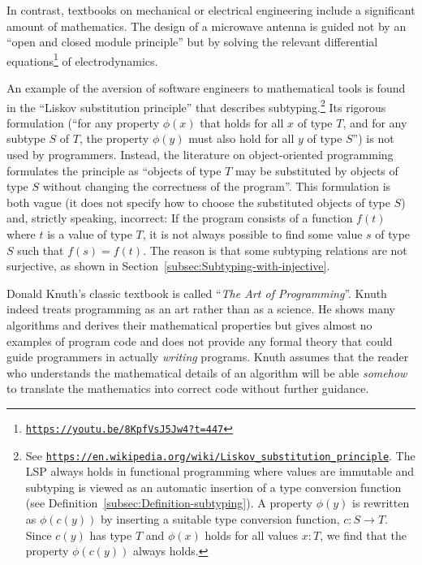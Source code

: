 In contrast, textbooks on mechanical or electrical engineering include
a significant amount of mathematics. The design of a microwave antenna
is guided not by an \textsf{``}open and closed module principle\textsf{''} but by
solving the relevant differential equations\footnote{\texttt{\href{https://youtu.be/8KpfVsJ5Jw4?t=447}{https://youtu.be/8KpfVsJ5Jw4?t=447}}}
of electrodynamics.

An example of the aversion of software engineers to mathematical tools
is found in the \textsf{``}Liskov substitution principle\textsf{''}
that describes subtyping.\footnote{See \texttt{\href{https://en.wikipedia.org/wiki/Liskov_substitution_principle}{https://en.wikipedia.org/wiki/Liskov\_substitution\_principle}}.
The LSP always holds in functional programming where values are immutable
and subtyping is viewed as an automatic insertion of a type conversion
function (see Definition~\ref{subsec:Definition-subtyping}). A property
$\phi(y)$ is rewritten as $\phi(c(y))$ by inserting a suitable type
conversion function, $c:S\rightarrow T$. Since $c(y)$ has type $T$
and $\phi(x)$ holds for all values $x:T$, we find that the property
$\phi(c(y))$ always holds.} Its rigorous formulation (\textsf{``}for any property $\phi(x)$ that holds
for all $x$ of type $T$, and for any subtype $S$ of $T$, the property
$\phi(y)$ must also hold for all $y$ of type $S$\textsf{''}) is not used
by programmers. Instead, the literature on object-oriented programming
formulates the principle as \textsf{``}objects of type $T$ may be substituted
by objects of type $S$ without changing the correctness of the program\textsf{''}.
This formulation  is both vague
(it does not specify how to choose the substituted objects of type
$S$) and, strictly speaking, incorrect: If the program consists of
a function $f(t)$ where $t$ is a value of type $T$, it is not always
possible to find some value $s$ of type $S$ such that $f(s)=f(t)$.
The reason is that some subtyping relations are not surjective, as
shown in Section~\ref{subsec:Subtyping-with-injective}.

Donald Knuth\textsf{'}s classic textbook is called \textsf{``}\emph{The Art of Programming}\textsf{''}.
Knuth indeed treats programming as an art rather than as a science.
He shows many algorithms and derives their mathematical properties
but gives almost no examples of program code and does not provide
any formal theory that could guide programmers in actually \emph{writing}
programs. Knuth assumes that the reader who understands the mathematical
details of an algorithm will be able \emph{somehow} to translate the
mathematics into correct code without further guidance.%
\begin{comment}
His books do not propose a formalism that could guide the process
of writing programs (say, choosing the data types to be used), similarly
to how calculations with \textsf{``}Green\textsf{'}s functions\textsf{''} in electrodynamics
are at the foundation of the design of a radar, while calculations
in theoretical mechanics involving \textsf{``}non-holonomic constraints\textsf{''}
are at the foundation of the design of a robot arm.
\end{comment}

